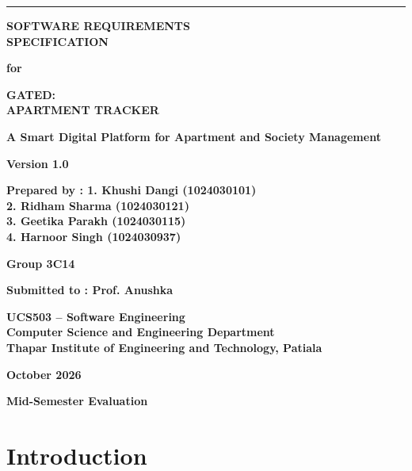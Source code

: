 \documentclass[a4paper,10pt]{scrartcl}
\numberwithin{figure}{section}
\begin{document}
\thispagestyle{tp}
\vspace*{-8mm}
\noindent\rule{1.09\textwidth}{1.6mm}
\vspace{5mm}
\begin{flushright}
{\Huge\bfseries SOFTWARE REQUIREMENTS\\ SPECIFICATION\par}
\vspace{9mm}
{\Huge\bfseries for\par}
\vspace{8mm}
{\Huge\bfseries GATED:\\ APARTMENT TRACKER\par}
\vspace{4mm}
{\large\bfseries A Smart Digital Platform for Apartment and Society Management\par}
\vspace{5mm}
{\Large\bfseries Version 1.0\par}
\vspace{6mm}
{\Large\bfseries Prepared by : 1. Khushi Dangi (1024030101)\\
2. Ridham Sharma  (1024030121)\\
3. Geetika Parakh (1024030115)\\
4. Harnoor Singh (1024030937)\par}
\vspace{1mm}
{\large\bfseries Group 3C14\par}
\vspace{5mm}
{\Large\bfseries Submitted to : Prof. Anushka\par}
\vspace{1mm}
{\large\bfseries UCS503 -- Software Engineering\\
Computer Science and Engineering Department\\
Thapar Institute of Engineering and Technology, Patiala\par}
\vspace{5mm}
{\Large\bfseries October 2026\par}
\vspace{1mm}
{\large\bfseries Mid-Semester Evaluation\par}
\end{flushright}
\newpage

\tableofcontents
\newpage

\section{Introduction}
\end{document}
